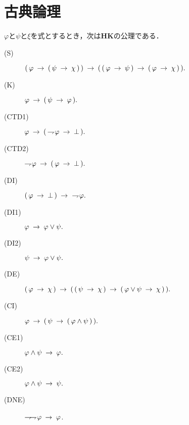\section{古典論理}
	\begin{screen}
		\begin{logicalaxm}
			$\varphi$と$\psi$と$\xi$を式とするとき，次は{\bf HK}の公理である．
			\begin{description}
				\item[(S)] $(\, \varphi \rarrow (\, \psi \rarrow \chi\, )\, ) 
					\rarrow (\, (\, \varphi \rarrow \psi\, )
					\rarrow (\, \varphi \rarrow \chi\, )\, ).$
				\item[(K)] $\varphi \rarrow (\, \psi \rarrow \varphi\, ).$
				\item[(CTD1)] $\varphi \rarrow (\, \negation \varphi \rarrow \bot\, ).$
				\item[(CTD2)] $\negation \varphi \rarrow (\, \varphi \rarrow \bot\, ).$
				\item[(DI)] $(\, \varphi \rarrow \bot\, ) \rarrow\ \negation \varphi.$
				\item[(DI1)] $\varphi \rarrow \varphi \vee \psi.$
				\item[(DI2)] $\psi \rarrow \varphi \vee \psi.$
				\item[(DE)] $(\, \varphi \rarrow \chi\, ) \rarrow 
					(\, (\, \psi \rarrow \chi\, ) 
					\rarrow (\, \varphi \vee \psi \rarrow \chi\, )\, ).$
				\item[(CI)] $\varphi \rarrow (\, \psi \rarrow (\, \varphi \wedge \psi\, )\, ).$
				\item[(CE1)] $\varphi \wedge \psi \rarrow \varphi.$
				\item[(CE2)] $\varphi \wedge \psi \rarrow \psi.$
				\item[(DNE)] $\negation \negation \varphi \rarrow \varphi$.
			\end{description}
		\end{logicalaxm}
	\end{screen}
	
